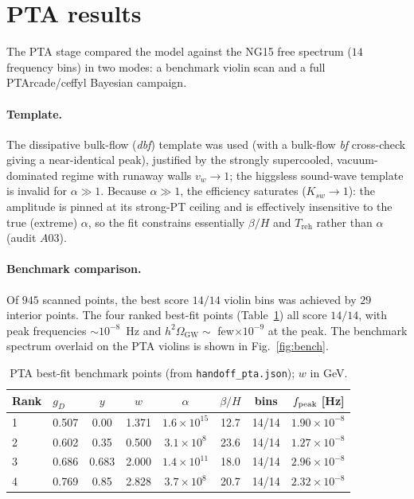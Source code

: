 \documentclass[11pt]{article}
\newcommand{\gD}{g_{D}}
\newcommand{\Treh}{T_{\mathrm{reh}}}
\newcommand{\betaH}{\beta/H}
\newcommand{\OmGW}{h^{2}\Omega_{\mathrm{GW}}}
\begin{document}
\section{PTA results}
\label{sec:pta}
The PTA stage compared the model against the NG15 free spectrum ($14$ frequency bins) in two
modes: a benchmark violin scan and a full PTArcade/ceffyl Bayesian campaign.

\paragraph{Template.} The dissipative bulk-flow (\emph{dbf}) template was used (with a
bulk-flow \emph{bf} cross-check giving a near-identical peak), justified by the strongly
supercooled, vacuum-dominated regime with runaway walls $v_w\to1$; the higgsless sound-wave
template is invalid for $\alpha\gg1$. Because $\alpha\gg1$, the efficiency saturates
($K_{sw}\to1$): the amplitude is pinned at its strong-PT ceiling and is effectively
insensitive to the true (extreme) $\alpha$, so the fit constrains essentially $\betaH$ and
$\Treh$ rather than $\alpha$ (audit $A03$).

\paragraph{Benchmark comparison.} Of $945$ scanned points, the best score $14/14$ violin bins
was achieved by $29$ interior points. The four ranked best-fit points
(Table~\ref{tab:pta}) all score $14/14$, with peak frequencies $\sim10^{-8}$~Hz and
$\OmGW\sim$ few$\times10^{-9}$ at the peak. The benchmark spectrum overlaid on the
PTA violins is shown in Fig.~\ref{fig:bench}.

\begin{table}[h]
\centering
\small
\caption{PTA best-fit benchmark points (from \texttt{handoff\_pta.json}); $w$ in GeV.}
\label{tab:pta}
\begin{tabular}{llcccccc}
\toprule
Rank & $\gD$ & $y$ & $w$ & $\alpha$ & $\betaH$ & bins & $f_{\rm peak}$ [Hz] \\
\midrule
1 & 0.507 & 0.00 & 1.371 & $1.6\times10^{15}$ & 12.7 & 14/14 & $1.90\times10^{-8}$ \\
2 & 0.602 & 0.35 & 0.500 & $3.1\times10^{8}$  & 23.6 & 14/14 & $1.27\times10^{-8}$ \\
3 & 0.686 & 0.683 & 2.000 & $1.4\times10^{11}$ & 18.0 & 14/14 & $2.96\times10^{-8}$ \\
4 & 0.769 & 0.85 & 2.828 & $3.7\times10^{8}$  & 20.7 & 14/14 & $2.32\times10^{-8}$ \\
\bottomrule
\end{tabular}
\end{table}
\end{document}
